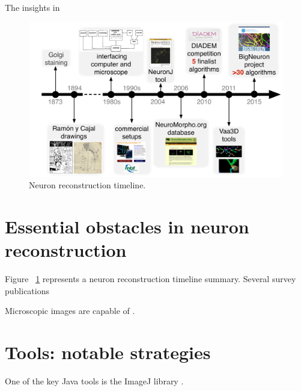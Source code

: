 The insights in
\begin{figure}
	\begin{center}
		\includegraphics[width=\textwidth]{ch1_fig1}
	\end{center}
	\vspace{-3ex}
	\caption{Neuron reconstruction timeline.}
	\vspace{-1ex}
	\label{ch1__fig1}
\end{figure}

\section{Essential obstacles in neuron reconstruction}

Figure ~\ref{ch1__fig1} represents a neuron reconstruction timeline summary. Several survey publications \cite{meijering2010neuron,donohue2011automated,acciai2016automated}

Microscopic images are capable of .

\section{Tools: notable strategies}
One of the key Java tools is the ImageJ library \cite{abramoff2004image}. 

